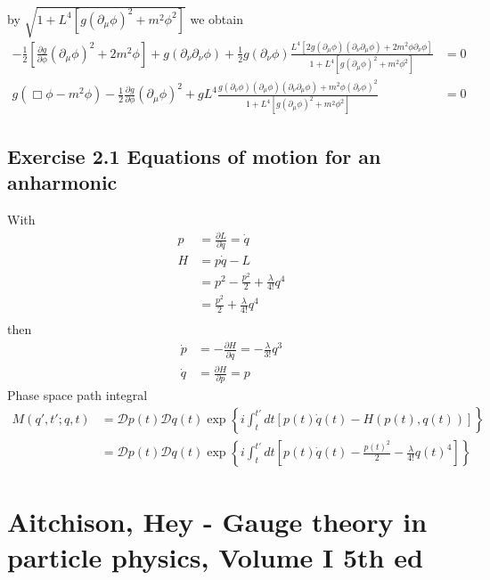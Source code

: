 \documentclass[../main.tex]{subfiles}
\begin{document}
by $\sqrt{1+L^4[g(\partial_\mu\phi)^2+m^2\phi^2]}$ we obtain
\begin{align}
-\frac{1}{2}\left[\frac{\partial g}{\partial\phi}(\partial_\mu\phi)^2+2m^2\phi\right]+g(\partial_\nu\partial_\nu\phi)+\frac{1}{2}g(\partial_\nu\phi)\frac{L^4[2g(\partial_\mu\phi)(\partial_\nu\partial_\mu\phi)+2m^2\phi\partial_\nu\phi]}{1+L^4[g(\partial_\mu\phi)^2+m^2\phi^2]}&=0\\
%
g(\Box\phi-m^2\phi)-\frac{1}{2}\frac{\partial g}{\partial\phi}(\partial_\mu\phi)^2+gL^4\frac{g(\partial_\nu\phi)(\partial_\mu\phi)(\partial_\nu\partial_\mu\phi)+m^2\phi(\partial_\nu\phi)^2}{1+L^4[g(\partial_\mu\phi)^2+m^2\phi^2]}&=0
\end{align}

\subsection{Exercise 2.1 Equations of motion for an anharmonic}
With
\begin{align}
p
&=\frac{\partial L}{\partial \dot{q}}=\dot{q}\\
H
&=p\dot{q}-L\\
&=p^2-\frac{p^2}{2}+\frac{\lambda}{4!}q^4\\
&=\frac{p^2}{2}+\frac{\lambda}{4!}q^4\\
\end{align}
then
\begin{align}
\dot{p}&=-\frac{\partial H}{\partial q}=-\frac{\lambda}{3!}q^3\\
\dot{q}&=\frac{\partial H}{\partial p}=p
\end{align}
Phase space path integral
\begin{align}
M(q',t';q,t)
&=\mathcal{D}p(t)\mathcal{D}q(t)\exp\left\{i\int_t^{t'}dt[p(t)\dot{q}(t)-H(p(t),q(t))]\right\}\\
&=\mathcal{D}p(t)\mathcal{D}q(t)\exp\left\{i\int_t^{t'}dt[p(t)\dot{q}(t)-\frac{p(t)^2}{2}-\frac{\lambda}{4!}q(t)^4]\right\}
\end{align}


\section{{\sc Aitchison, Hey} - Gauge theory in particle physics, Volume I 5th ed}
\end{document}
